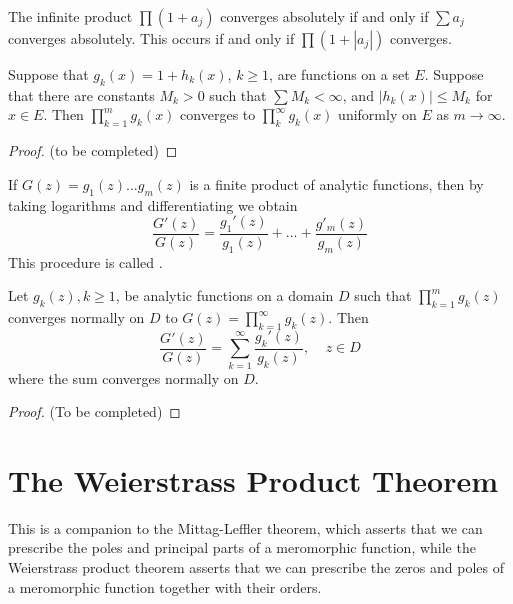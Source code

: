 \begin{theorem}
    The infinite product $\prod(1+a_j)$ converges absolutely if and only if $\sum a_j$ converges absolutely. This occurs if and only if $\prod(1+|a_j|)$ converges.
\end{theorem}


\begin{theorem}
    Suppose that $g_k(x) = 1+h_k(x)$, $k \geq 1$, are functions on a set $E$. Suppose that there are constants $M_k > 0$ such that $\sum M_k < \infty$, and $|h_k(x)| \leq M_k$ for $x \in E$. Then $\prod_{k=1}^mg_k(x)$ converges to $\prod_k^{\infty}g_k(x)$ uniformly on $E$ as $m\rightarrow \infty$.
\end{theorem}
\begin{proof}
    (to be completed)
\end{proof}

If $G(z) = g_1(z)...g_m(z)$ is a finite product of analytic functions, then by taking logarithms and differentiating we obtain\begin{equation*}
    \frac{G'(z)}{G(z)} = \frac{g_1'(z)}{g_1(z)} + ... + \frac{g'_m(z)}{g_m(z)}
\end{equation*}
This procedure is called .

\begin{theorem}
    Let $g_k(z), k \geq 1$, be analytic functions on a domain $D$ such that $\prod_{k=1}^mg_k(z)$ converges normally on $D$ to $G(z) = \prod_{k=1}^{\infty}g_k(z)$. Then \begin{equation*}
        \frac{G'(z)}{G(z)} = \sum_{k=1}^{\infty}\frac{g_k'(z)}{g_k(z)},\;\;\;\;z \in D
    \end{equation*}
    where the sum converges normally on $D$.
\end{theorem}
\begin{proof}
    (To be completed)
\end{proof}



\section{The Weierstrass Product Theorem}

This is a companion to the Mittag-Leffler theorem, which asserts that we can prescribe the poles and principal parts of a meromorphic function, while the Weierstrass product theorem asserts that we can prescribe the zeros and poles of a meromorphic function together with their orders.

